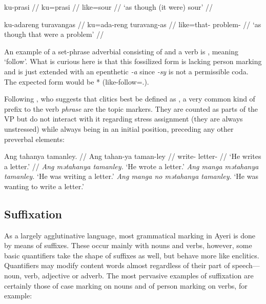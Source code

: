 \a\begingl
	\gla ku-prasi //
	\glb ku=prasi //
	\glc like=sour //
	\glft `as though (it were) sour' //
\endgl

\a\begingl
	\gla ku-adareng turavangas //
	\glb ku=ada-reng turavang-as //
	\glc like=that-\AargI{} problem-\Parg{} //
	\glft `as though that were a problem' //
\endgl
\xe

An example of a set-phrase adverbial consisting of  and a verb 
is ,  meaning `follow'. 
What is curious here is that this fossilized form is lacking person marking 
and is just extended with an epenthetic \textit{-a} since \textit{-sy} is not 
a permissible coda. The expected form would be 
* (like-follow=\TsgI{}.\Aarg{}).

Following \citet{klavans1985}, who suggests that clitics best be defined as
, a very common 
kind of prefix to the verb \emph{phrase} are the topic markers. They are
counted as parts of the VP but do not interact with it regarding stress
assignment (they are always unstressed) while always being in an initial
position, preceding any other preverbal elements:

\pex
	\a\begingl
		\gla Ang tahanya tamanley. //
		\glb Ang tahan-ya taman-ley //
		\glc \AgtT{} write-\TsgM{} letter-\PargI{} //
		\glft `He writes a letter.' //
	\endgl
	\a \textit{Ang mətahanya tamanley.} `He wrote a letter.'
	\a \textit{Ang manga mətahanya tamanley.} `He was writing a letter.'
	\a \textit{Ang manga no mətahanya tamanley.} `He was wanting to write a 
		letter.'
\xe



\subsection{Suffixation}

As a largely agglutinative language, most grammatical marking in Ayeri is done
by means of suffixes. These occur mainly with nouns and verbs, however, some
basic quantifiers take the shape of suffixes as well, but behave more like
enclitics. Quantifiers may modify content words almost regardless of their part
of speech---noun, verb, adjective or adverb. The most pervasive examples of
suffixation are certainly those of case marking on nouns and of person marking
on verbs, for example:

